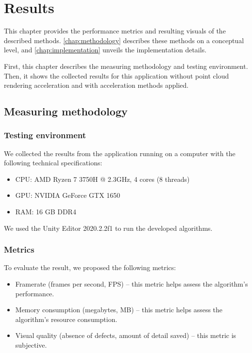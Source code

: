 \chapter{Results}
\label{chap:implementation}

\graphicspath{{figs/results/}}

This chapter provides the performance metrics and resulting visuals of the described methods. \autoref{chap:methodology} describes these methods on a conceptual level, and \autoref{chap:implementation} unveils the implementation details.

First, this chapter describes the measuring methodology and testing environment. Then, it shows the collected results for this application without point cloud rendering acceleration and with acceleration methods applied.


\section{Measuring methodology}

\subsection{Testing environment}

We collected the results from the application running on a computer with the following technical specifications:

\begin{itemize}
    \item CPU: AMD Ryzen 7 3750H @ 2.3GHz, 4 cores (8 threads)
    \item GPU: NVIDIA GeForce GTX 1650
    \item RAM: 16 GB DDR4
\end{itemize}

We used the Unity Editor 2020.2.2f1 to run the developed algorithms.

\subsection{Metrics}

To evaluate the result, we proposed the following metrics:

\begin{itemize}
    \item Framerate (frames per second, FPS) – this metric helps assess the algorithm's performance.
    \item Memory consumption (megabytes, MB) – this metric helps assess the algorithm's resource consumption.
    \item Visual quality (absence of defects, amount of detail saved) – this metric is subjective.
\end{itemize}

